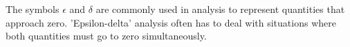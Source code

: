 The symbols $ \epsilon $ and $ \delta $ are commonly used in analysis to
represent quantities that approach zero. 'Epsilon-delta' analysis often
has to deal with situations where both quantities must go to zero simultaneously.